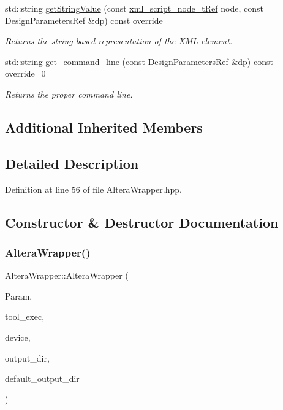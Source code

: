 \begin{DoxyCompactItemize}
std\+::string \hyperlink{classAlteraWrapper_a3a0bb0f3531b35bf4e9b615042b00e97}{get\+String\+Value} (const \hyperlink{xml__script__command_8hpp_a1fe3d50ade66bc35e41be9b68bbbcd02}{xml\+\_\+script\+\_\+node\+\_\+t\+Ref} node, const \hyperlink{DesignParameters_8hpp_ae36bb1c4c9150d0eeecfe1f96f42d157}{Design\+Parameters\+Ref} \&dp) const override
\begin{DoxyCompactList}\small\item\em Returns the string-\/based representation of the X\+ML element. \end{DoxyCompactList}\item 
std\+::string \hyperlink{classAlteraWrapper_a1b6c44694f0bd28b6f458245fd373326}{get\+\_\+command\+\_\+line} (const \hyperlink{DesignParameters_8hpp_ae36bb1c4c9150d0eeecfe1f96f42d157}{Design\+Parameters\+Ref} \&dp) const override=0
\begin{DoxyCompactList}\small\item\em Returns the proper command line. \end{DoxyCompactList}\end{DoxyCompactItemize}
\subsection*{Additional Inherited Members}


\subsection{Detailed Description}


Definition at line 56 of file Altera\+Wrapper.\+hpp.



\subsection{Constructor \& Destructor Documentation}
\mbox{\label{classAlteraWrapper_a14be514ee813d96f8022ddd04db156e4}} 
\subsubsection{\texorpdfstring{Altera\+Wrapper()}{AlteraWrapper()}}
{\footnotesize\ttfamily Altera\+Wrapper\+::\+Altera\+Wrapper (\begin{DoxyParamCaption}\item[{const \hyperlink{Parameter_8hpp_a37841774a6fcb479b597fdf8955eb4ea}{Parameter\+Const\+Ref} \&}]{Param,  }\item[{const std\+::string \&}]{tool\+\_\+exec,  }\item[{const \hyperlink{target__device_8hpp_acedb2b7a617e27e6354a8049fee44eda}{target\+\_\+device\+Ref} \&}]{device,  }\item[{const std\+::string \&}]{output\+\_\+dir,  }\item[{const std\+::string \&}]{default\+\_\+output\+\_\+dir }\end{DoxyParamCaption})}



